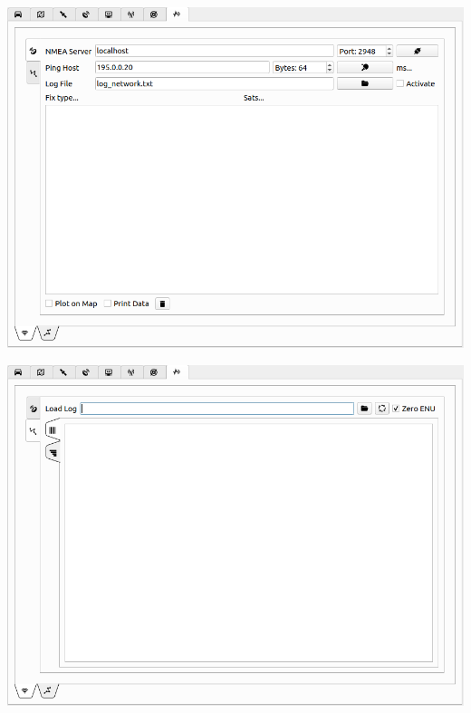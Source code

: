 \documentclass[12pt]{article} %
\begin{document}
\noindent\begin{minipage}{0.3\linewidth}
\noindent \includegraphics[width=\textwidth]{./screens/Log1.png}
\end{minipage}
\begin{minipage}{0.3\linewidth}
\noindent \includegraphics[width=\textwidth]{./screens/Log2.png}
\end{minipage}
\end{document}
